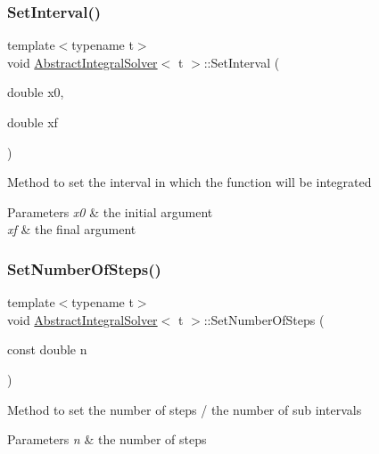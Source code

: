 \subsubsection{\texorpdfstring{Set\+Interval()}{SetInterval()}}
{\footnotesize\ttfamily template$<$typename t$>$ \\
void \hyperlink{class_abstract_integral_solver}{Abstract\+Integral\+Solver}$<$ t $>$\+::Set\+Interval (\begin{DoxyParamCaption}\item[{double}]{x0,  }\item[{double}]{xf }\end{DoxyParamCaption})\hspace{0.3cm}{\ttfamily [inline]}}

Method to set the interval in which the function will be integrated 
\begin{DoxyParams}{Parameters}
{\em x0} & the initial argument \\
\hline
{\em xf} & the final argument \\
\hline
\end{DoxyParams}
\mbox{\label{class_abstract_integral_solver_ab74cb9894daf3bcc97e14158a6087d99}} 
\subsubsection{\texorpdfstring{Set\+Number\+Of\+Steps()}{SetNumberOfSteps()}}
{\footnotesize\ttfamily template$<$typename t$>$ \\
void \hyperlink{class_abstract_integral_solver}{Abstract\+Integral\+Solver}$<$ t $>$\+::Set\+Number\+Of\+Steps (\begin{DoxyParamCaption}\item[{const double}]{n }\end{DoxyParamCaption})\hspace{0.3cm}{\ttfamily [inline]}}

Method to set the number of steps / the number of sub intervals 
\begin{DoxyParams}{Parameters}
{\em n} & the number of steps \\
\hline
\end{DoxyParams}
\mbox{\label{class_abstract_integral_solver_ad87cb44c5ef3122bc95be48f473ba399}} 
